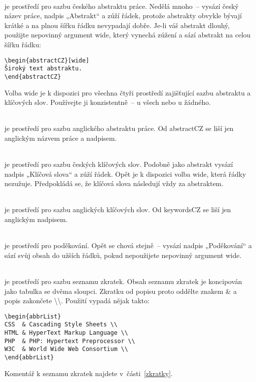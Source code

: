 \documentclass[FM,DP,fonts]{tulthesis}
\newcommand{\argument}[1]{{\ttfamily\color{\tulcolor}#1}}
\newcommand{\argumentindex}[1]{\argument{#1}\index{#1}}
\newcommand{\prostredi}[1]{\argumentindex{#1}}
\newenvironment{myquote}{\begin{list}{}{\setlength\leftmargin\parindent}\item[]}{\end{list}}
\newenvironment{listing}{\begin{myquote}\color{\tulcolor}}{\end{myquote}}
\newcommand{\polozka}[1]{\item[#1]\mbox{}\\}
\begin{document}
\begin{description}
\polozka{\prostredi{abstractCZ}} je prostředí pro sazbu českého abstraktu práce.
Nedělá mnoho~-- vysází český název práce, nadpis „Abstrakt“ a zúží řádek,
protože abstrakty obvykle bývají krátké a na plnou šířku řádku nevypadají
dobře. Je-li váš abstrakt dlouhý, použijte nepovinný argument \argument{wide},
který vynechá zúžení a sází abstrakt na celou šířku řádku:

\begin{listing}
\begin{verbatim}
\begin{abstractCZ}[wide]
Široký text abstraktu.
\end{abstractCZ}
\end{verbatim}
\end{listing}

Volba \argument{wide} je k dispozici pro všechna čtyři prostředí zajišťující
sazbu abstraktu a klíčových slov. Používejte ji konzistentně~-- u všech nebo u
žádného.

\polozka{\prostredi{abstractEN}} je prostředí pro sazbu anglického abstraktu práce.
Od \argument{abstractCZ} se liší jen anglickým názvem práce a nadpisem.

\polozka{\prostredi{keywordsCZ}} je prostředí pro sazbu českých klíčových slov.
Podobně jako abstrakt vysází nadpis „Klíčová slova“ a zúží řádek. Opět je k
dispozici volba \argument{wide}, která řádky nezužuje. Předpokládá se, že
klíčová slova následují vždy za abstraktem.

\polozka{\prostredi{keywordsEN}} je prostředí pro sazbu anglických klíčových slov.
Od \argument{keywordsCZ} se liší jen anglickým nadpisem.

\polozka{\prostredi{acknowledgement}} je prostředí pro poděkování. Opět se chová
stejně~-- vysází nadpis „Poděkování“ a sází svůj obsah do užších řádků, pokud
nepoužijete nepovinný argument \argument{wide}.

\polozka{\prostredi{abbrList}} je prostředí pro sazbu seznamu zkratek. Obsah
seznamu zkratek je koncipován jako tabulka se dvěma sloupci. Zkratku od popisu
proto oddělte znakem \argument{\&} a popis zakončete
\argument{\textbackslash\textbackslash}. Použití vypadá nějak takto:

{\color{\tulcolor}
\begin{verbatim}
\begin{abbrList}
CSS  & Cascading Style Sheets \\
HTML & HyperText Markup Language \\
PHP  & PHP: Hypertext Preprocessor \\
W3C  & World Wide Web Consortium \\
\end{abbrList}
\end{verbatim}}

Komentář k seznamu zkratek najdete v~části~\ref{zkratky}.

\end{description}
\end{document}
